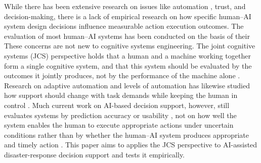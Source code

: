\documentclass[journal]{IEEEtran}
\theoremstyle{plain}
\theoremstyle{definition}
\providecommand{\DIFaddtex}[1]{{\protect\color{blue} \sf #1}} %
\providecommand{\DIFdeltex}[1]{{\protect\color{red} \scriptsize #1}} %
\providecommand{\DIFaddbegin}{} %
\providecommand{\DIFaddend}{} %
\providecommand{\DIFdelbegin}{} %
\providecommand{\DIFdelend}{} %
\providecommand{\DIFadd}[1]{\texorpdfstring{\DIFaddtex{#1}}{#1}} %
\providecommand{\DIFdel}[1]{\texorpdfstring{\DIFdeltex{#1}}{}} %
\newcommand{\DIFscaledelfig}{0.5}
\newlength{\DIFdelgraphicswidth} %
\newlength{\DIFdelgraphicsheight} %
\newcommand{\DIFaddincludegraphics}[2][]{{\color{blue}\fbox{\DIFOincludegraphics[#1]{#2}}}} %
\newcommand{\DIFdelincludegraphics}[2][]{%
\sbox{\DIFdelgraphicsbox}{\DIFOincludegraphics[#1]{#2}}%
\settoboxwidth{\DIFdelgraphicswidth}{\DIFdelgraphicsbox} %
\settoboxtotalheight{\DIFdelgraphicsheight}{\DIFdelgraphicsbox} %
\scalebox{\DIFscaledelfig}{%
\parbox[b]{\DIFdelgraphicswidth}{\usebox{\DIFdelgraphicsbox}\\[-\baselineskip] \rule{\DIFdelgraphicswidth}{0em}}\llap{\resizebox{\DIFdelgraphicswidth}{\DIFdelgraphicsheight}{%
\setlength{\unitlength}{\DIFdelgraphicswidth}%
\begin{picture}(1,1)%
\thicklines\linethickness{2pt} %
{\color[rgb]{1,0,0}\put(0,0){\framebox(1,1){}}}%
{\color[rgb]{1,0,0}\put(0,0){\line( 1,1){1}}}%
{\color[rgb]{1,0,0}\put(0,1){\line(1,-1){1}}}%
\end{picture}%
}\hspace*{3pt}}} %
} %
\DeclareRobustCommand{\DIFaddbegin}{\DIFOaddbegin \let\includegraphics\DIFaddincludegraphics} %
\DeclareRobustCommand{\DIFaddend}{\DIFOaddend \let\includegraphics\DIFOincludegraphics} %
\DeclareRobustCommand{\DIFdelbegin}{\DIFOdelbegin \let\includegraphics\DIFdelincludegraphics} %
\DeclareRobustCommand{\DIFdelend}{\DIFOaddend \let\includegraphics\DIFOincludegraphics} %
\begin{document}
\DIFdelbegin \DIFdel{While there has been extensive research on issues like automation , trust, and decision-making, there is a lack of empirical research on how specific human--AI system design decisions influence measurable action execution outcomes. The evaluation of most human--AI systems has been conducted on the basis of their }\DIFdelend \DIFaddbegin \DIFadd{These concerns are not new to cognitive systems engineering. The joint cognitive systems (JCS) perspective holds that a human and a machine working together form a single cognitive system, and that this system should be evaluated by the outcomes it jointly produces, not by the performance of the machine alone \cite{Hollnagel2005JCS,Woods2006JCS}. Research on adaptive automation and levels of automation has likewise studied how support should change with task demands while keeping the human in control \cite{Parasuraman2000LOA,Kaber2004,Scerbo2007}. Much current work on AI-based decision support, however, still evaluates systems by }\DIFaddend prediction accuracy or usability \DIFdelbegin \DIFdel{, not on how well the system enables the human to execute appropriate actions under uncertain conditions }\DIFdelend \DIFaddbegin \DIFadd{rather than by whether the human--AI system produces appropriate and timely action }\DIFaddend \cite{Lai2023FAccT,Muller2022CHIWORK,Yang2022THMSReview,lim2026generativeaidrivenreliabilitylayer}. This paper \DIFdelbegin \DIFdel{aims to }\DIFdelend \DIFaddbegin \DIFadd{applies the JCS perspective to AI-assisted disaster-response decision support and tests it empirically.
}
\end{document}
